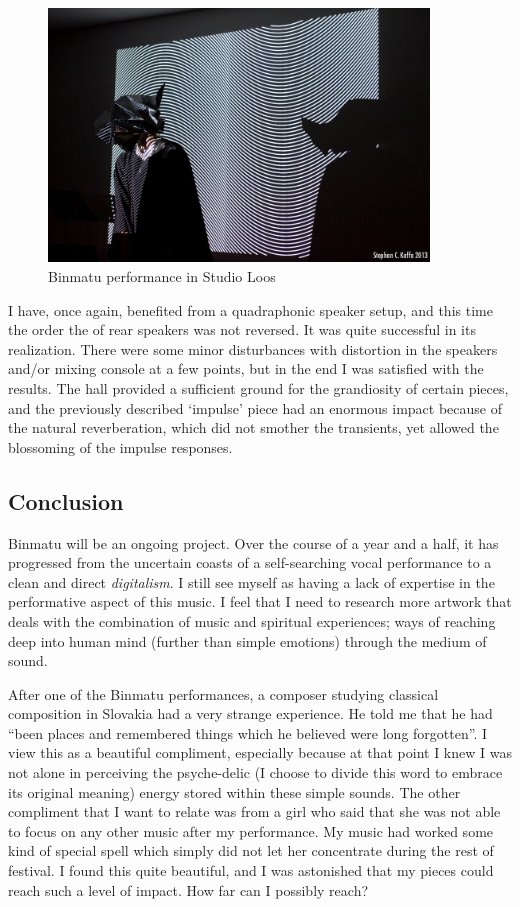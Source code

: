 \documentclass[12pt,a4paper,oneside]{report}
\begin{document}
\begin{figure}  
  \centering
    \includegraphics[width=0.9\textwidth]{img/binmatu_perfo}
        \caption{Binmatu performance in Studio Loos}
        \label{fig:binmatu_perfo}
\end{figure}

I have, once again, benefited from a quadraphonic speaker setup, and this time the order the of rear speakers was not reversed. It was quite successful in its realization. There were some minor disturbances with distortion in the speakers and/or mixing console at a few points, but in the end I was satisfied with the results. The hall provided a sufficient ground for the grandiosity of certain pieces, and the previously described `impulse' piece had an enormous impact because of the natural reverberation, which did not smother the transients, yet allowed the blossoming of the impulse responses.

\subsection{Conclusion}

Binmatu will be an ongoing project. Over the course of a year and a half, it has progressed from the uncertain coasts of a self-searching vocal performance to a clean and direct \emph{digitalism}. I still see myself as having a lack of expertise in the performative aspect of this music. I feel that I need to research more artwork that deals with the combination of music and spiritual experiences; ways of reaching deep into human mind (further than simple emotions) through the medium of sound. 

After one of the Binmatu performances, a composer studying classical composition in Slovakia had a very strange experience. He told me that he had ``been places and remembered things which he believed were long forgotten''. I view this as a beautiful compliment, especially because at that point I knew I was not alone in perceiving the psyche-delic (I choose to divide this word to embrace its original meaning) energy stored within these simple sounds. The other compliment that I want to relate was from a girl who said that she was not able to focus on any other music after my performance. My music had worked some kind of special spell which simply did not let her concentrate during the rest of festival. I found this quite beautiful, and I was astonished that my pieces could reach such a level of impact. How far can I possibly reach?
\end{document}
